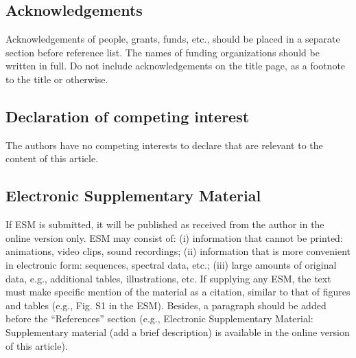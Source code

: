 \documentclass{CVM}
\begin{document}
\subsection*{Acknowledgements}
Acknowledgements of people,
grants, funds, etc., should be placed in a separate section before reference
list. The names of funding organizations should be written in full. Do not
include acknowledgements on the title page, as a footnote to the title or
otherwise.

\subsection*{Declaration of competing interest}

The authors have no competing interests to declare that are relevant to the
content of this article.\\

\subsection*{Electronic Supplementary Material  }

If ESM is submitted, it will be published as received from the author in the
online version only. ESM may consist of: (i) information that cannot be
printed: animations, video clips, sound recordings; (ii) information that is
more convenient in electronic form: sequences, spectral data, etc.; (iii)
large amounts of original data, e.g., additional tables, illustrations, etc.
If supplying any ESM, the text must make specific mention of the material as
a citation, similar to that of figures and tables (e.g., Fig. S1 in the
ESM). Besides, a paragraph should be added before the ``References'' section
(e.g., Electronic Supplementary Material: Supplementary material (add a
brief description) is available in the online version of this article).
\end{document}

